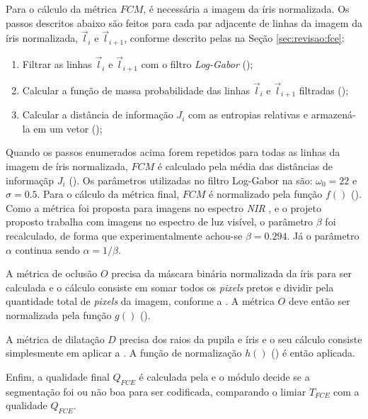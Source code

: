 \par Para o cálculo da métrica $FCM$, é necessária a imagem da íris normalizada. Os passos descritos abaixo são feitos para cada par adjacente de linhas da imagem da íris normalizada, $\vec{l}_{i}$ e $\vec{l}_{i+1}$, conforme descrito pelas  na Seção \ref{sec:revisao:fce}:

\begin{enumerate}
    \item Filtrar as linhas $\vec{l}_{i}$ e $\vec{l}_{i+1}$ com o filtro \textit{Log-Gabor} ();
    \item Calcular a função de massa probabilidade das linhas $\vec{l}_{i}$ e $\vec{l}_{i+1}$ filtradas ();
    \item Calcular a distância de informação $J_{i}$ com as entropias relativas e armazená-la em um vetor ();
\end{enumerate}

\par Quando os passos enumerados acima forem repetidos para todas as linhas da imagem de íris normalizada, $FCM$ é calculado pela média das distâncias de informaçãp $J_{i}$ (). Os parâmetros utilizadas no filtro Log-Gabor na  são: $\omega_{0} = 22$ e $\sigma = 0.5$. Para o cálculo da métrica final, $FCM$ é normalizado pela função $f()$ (). Como a métrica foi proposta para imagens no espectro \textit{NIR} \cite{du2010}, e o projeto proposto trabalha com imagens no espectro de luz visível, o parâmetro $\beta$ foi recalculado, de forma que experimentalmente achou-se $\beta = 0.294$. Já o parâmetro $\alpha$ continua sendo $\alpha = 1/\beta$.

\par A métrica de oclusão $O$ precisa da máscara binária normalizada da íris para ser calculada e o cálculo consiste em somar todos os \textit{pixels} pretos e dividir pela quantidade total de \textit{pixels} da imagem, conforme a . A métrica $O$ deve então ser normalizada pela função $g()$ ().

\par A métrica de dilatação $D$ precisa dos raios da pupila e íris e o seu cálculo consiste simplesmente em aplicar a . A função de normalização $h()$ () é então aplicada.

\par Enfim, a qualidade final $Q_{FCE}$ é calculada pela  e o módulo decide se a segmentação foi ou não boa para ser codificada, comparando o limiar $T_{FCE}$ com a qualidade $Q_{FCE}$.

